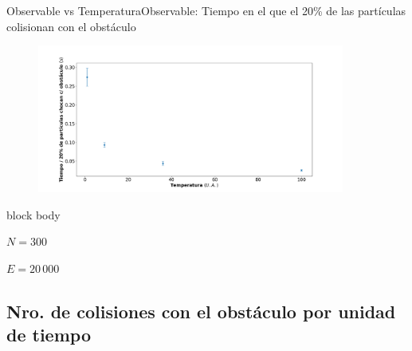 \documentclass{beamer}
\begin{document}
            \begin{frame}{Observable vs Temperatura}{Observable: Tiempo en el que el 20\% de las partículas colisionan con el obstáculo}
                \begin{figure}[H!]
                    \includegraphics[width=0.9\textwidth]{./threshold_vs_temperature}
                    \label{fig:threshold_2}
                \end{figure}
                \begin{beamercolorbox}[sep=5pt,center]{block body}
                    \begin{minipage}[t]{0.45\textwidth}
                        \centering
                        \small{$N=300$}
                    \end{minipage}
                    \hfill
                    \begin{minipage}[t]{0.45\textwidth}
                        \centering
                        \small{$E=20\,000$}
                    \end{minipage}
                \end{beamercolorbox}
            \end{frame}

        \subsection{Nro. de colisiones con el obstáculo por unidad de tiempo}
\end{document}
